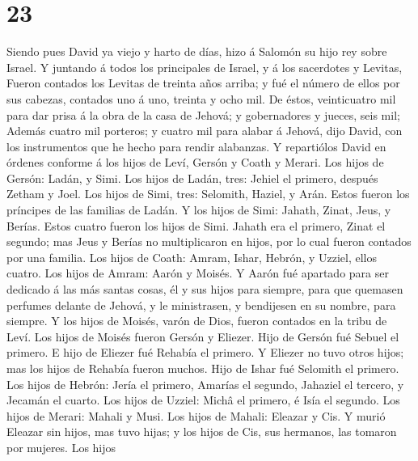 \hypertarget{section-22}{%
\section{23}\label{section-22}}

 Siendo pues David ya viejo y harto de días, hizo á
Salomón su hijo rey sobre Israel.  Y juntando á todos los
principales de Israel, y á los sacerdotes y Levitas, 
Fueron contados los Levitas de treinta años arriba; y fué el número de
ellos por sus cabezas, contados uno á uno, treinta y ocho mil.
 De éstos, veinticuatro mil para dar prisa á la obra de la
casa de Jehová; y gobernadores y jueces, seis mil;  Además
cuatro mil porteros; y cuatro mil para alabar á Jehová, dijo David, con
los instrumentos que he hecho para rendir alabanzas.  Y
repartiólos David en órdenes conforme á los hijos de Leví, Gersón y
Coath y Merari.  Los hijos de Gersón: Ladán, y Simi.
 Los hijos de Ladán, tres: Jehiel el primero, después
Zetham y Joel.  Los hijos de Simi, tres: Selomith, Haziel,
y Arán. Estos fueron los príncipes de las familias de Ladán.
 Y los hijos de Simi: Jahath, Zinat, Jeus, y Berías.
Estos cuatro fueron los hijos de Simi.  Jahath era el
primero, Zinat el segundo; mas Jeus y Berías no multiplicaron en hijos,
por lo cual fueron contados por una familia.  Los hijos
de Coath: Amram, Ishar, Hebrón, y Uzziel, ellos cuatro. 
Los hijos de Amram: Aarón y Moisés. Y Aarón fué apartado para ser
dedicado á las más santas cosas, él y sus hijos para siempre, para que
quemasen perfumes delante de Jehová, y le ministrasen, y bendijesen en
su nombre, para siempre.  Y los hijos de Moisés, varón de
Dios, fueron contados en la tribu de Leví.  Los hijos de
Moisés fueron Gersón y Eliezer.  Hijo de Gersón fué
Sebuel el primero.  E hijo de Eliezer fué Rehabía el
primero. Y Eliezer no tuvo otros hijos; mas los hijos de Rehabía fueron
muchos.  Hijo de Ishar fué Selomith el primero.
 Los hijos de Hebrón: Jería el primero, Amarías el
segundo, Jahaziel el tercero, y Jecamán el cuarto.  Los
hijos de Uzziel: Michâ el primero, é Isía el segundo. 
Los hijos de Merari: Mahali y Musi. Los hijos de Mahali: Eleazar y Cis.
 Y murió Eleazar sin hijos, mas tuvo hijas; y los hijos
de Cis, sus hermanos, las tomaron por mujeres.  Los hijos
